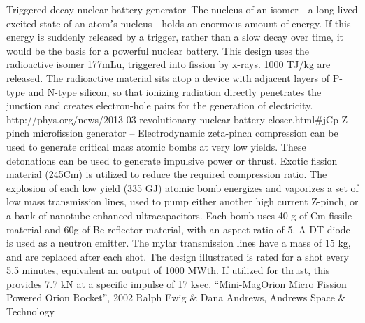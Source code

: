\documentclass[a4paper]{book}
\begin{document}
Triggered decay nuclear battery generator–The nucleus of an isomer—a long-lived excited state of an atomʼs nucleus—holds an enormous amount of energy. If  this energy is suddenly released by a trigger, rather than a slow decay over time, it would be the basis for a powerful nuclear battery. This design uses the radioactive isomer 177mLu, triggered into fission by x-rays.  1000 TJ/kg are released. The radioactive material sits atop a device with adjacent layers of P-type and N-type silicon, so that ionizing radiation directly penetrates the junction and creates electron-hole pairs for the generation of electricity. http://phys.org/news/2013-03-revolutionary-nuclear-battery-closer.html\#jCp
Z-pinch microfission generator – Electrodynamic zeta-pinch compression can be used to generate critical mass atomic bombs at very low yields. These detonations can be used to generate impulsive power or thrust. Exotic fission material (245Cm) is utilized to reduce the required compression ratio. The explosion of each low yield (335 GJ) atomic bomb energizes and vaporizes a set of low mass transmission lines, used to pump either another high current Z-pinch, or a bank of nanotube-enhanced ultracapacitors. Each bomb uses 40 g of Cm fissile material and 60g of Be reflector material, with an aspect ratio of 5. A DT diode is used as a neutron emitter. The mylar transmission lines have a mass of 15 kg, and are replaced after each shot. The design illustrated is rated for a shot every 5.5 minutes, equivalent an output of 1000 MWth. If utilized for thrust, this provides 7.7 kN at a specific impulse of 17 ksec.
“Mini-MagOrion Micro Fission Powered Orion Rocket”, 2002 Ralph Ewig \& Dana Andrews, Andrews Space \& Technology
 
\end{document}
